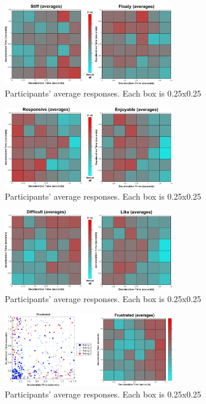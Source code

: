 \begin{figure}[htbp]
\centering
\includegraphics[width=0.67\textwidth]{Pics/Classes/averages/Stiff_floaty_avg}
\caption{Participants' average responses. Each box is 0.25x0.25}
\label{fig:stiff_floaty_avg}
\end{figure}

\begin{figure}[htbp]
\centering
\includegraphics[width=0.67\textwidth]{Pics/Classes/averages/Responsive_enjoyable_avg}
\caption{Participants' average responses. Each box is 0.25x0.25}
\label{fig:responsive_enjoyable_avg}
\end{figure}

\begin{figure}[htbp]
\centering
\includegraphics[width=0.67\textwidth]{Pics/Classes/averages/difficult_like_avg}
\caption{Participants' average responses. Each box is 0.25x0.25}
\label{fig:difficult_liked_avg}
\end{figure}

\begin{figure}[htbp]
\centering
\includegraphics[width=0.67\textwidth]{Pics/Classes/averages/frustrated_frustrated}
\caption{Participants' average responses. Each box is 0.25x0.25}
\label{fig:frustrated_avg}
\end{figure}

